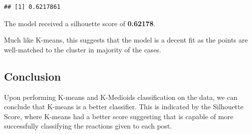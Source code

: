 \documentclass[
]{article}
\begin{document}
\begin{verbatim}
## [1] 0.6217861
\end{verbatim}

The model received a silhouette score of \textbf{0.62178}.

Much like K-means, this suggests that the model is a decent fit as the
points are well-matched to the cluster in majority of the cases.

\subsection{Conclusion}\label{conclusion}

Upon performing K-means and K-Medioids classification on the data, we
can conclude that K-means is a better classifier. This is indicated by
the Silhouette Score, where K-means had a better score suggesting that
is capable of more successfully classifying the reactions given to each
post.
\end{document}
